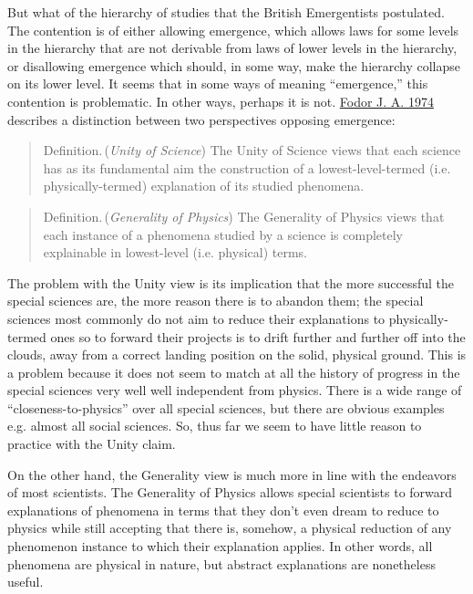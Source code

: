 \documentclass{article}
\newcommand{\ti}[1]{\textit{#1}}
\newcommand{\definition}{{\sc Definition.}\,}
\renewcommand{\cite}[1]{\hyperlink{#1}{#1}}
\begin{document}

But what of the hierarchy of studies that the British Emergentists postulated. The contention is of either allowing emergence, which allows laws for some levels in the hierarchy that are not derivable from laws of lower levels in the hierarchy, or disallowing emergence which should, in some way, make the hierarchy collapse on its lower level. It seems that in some ways of meaning ``emergence,'' this contention is problematic. In other ways, perhaps it is not. \cite{Fodor J. A. 1974} describes a distinction between two perspectives opposing emergence:

\begin{quote}
    \definition (\ti{Unity of Science}) The Unity of Science views that each science has as its fundamental aim the construction of a lowest-level-termed (i.e. physically-termed) explanation of its studied phenomena.
\end{quote}

\begin{quote}
    \definition (\ti{Generality of Physics}) The Generality of Physics views that each instance of a phenomena studied by a science is completely explainable in lowest-level (i.e. physical) terms.
\end{quote}

The problem with the Unity view is its implication that the more successful the special sciences are, the more reason there is to abandon them; the special sciences most commonly do not aim to reduce their explanations to physically-termed ones so to forward their projects is to drift further and further off into the clouds, away from a correct landing position on the solid, physical ground. This is a problem because it does not seem to match at all the history of progress in the special sciences very well well independent from physics. There is a wide range of ``closeness-to-physics'' over all special sciences, but there are obvious examples e.g. almost all social sciences. So, thus far we seem to have little reason to practice with the Unity claim.

On the other hand, the Generality view is much more in line with the endeavors of most scientists. The Generality of Physics allows special scientists to forward explanations of phenomena in terms that they don't even dream to reduce to physics while still accepting that there is, somehow, a physical reduction of any phenomenon instance to which their explanation applies. In other words, all phenomena are physical in nature, but abstract explanations are nonetheless useful.
\end{document}
